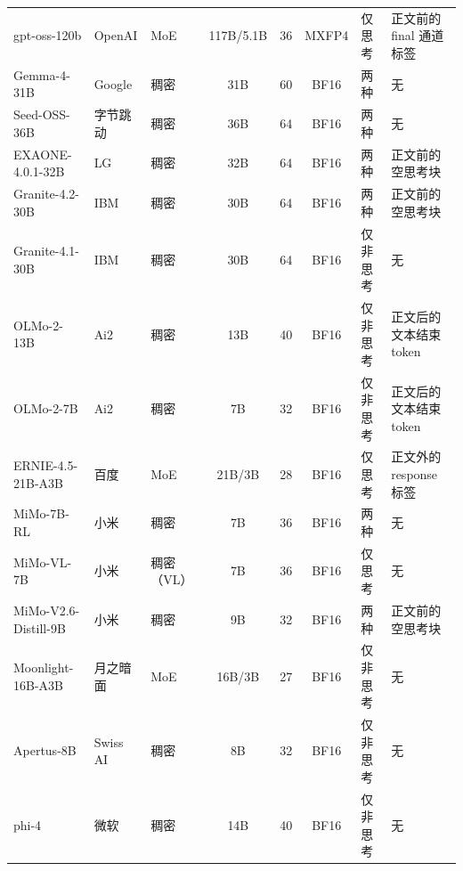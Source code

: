 \begin{table}[htbp]
\begin{tabular}{ll>{\raggedright\arraybackslash}p{1.9cm}cccl>{\raggedright\arraybackslash}p{2.8cm}}
gpt-oss-120b & OpenAI & MoE & 117B/5.1B & 36 & MXFP4 & 仅思考 & 正文前的 final 通道标签 \\
Gemma-4-31B & Google & 稠密 & 31B & 60 & BF16 & 两种 & 无 \\
Seed-OSS-36B & 字节跳动 & 稠密 & 36B & 64 & BF16 & 两种 & 无 \\
EXAONE-4.0.1-32B & LG & 稠密 & 32B & 64 & BF16 & 两种 & 正文前的空思考块 \\
Granite-4.2-30B & IBM & 稠密 & 30B & 64 & BF16 & 两种 & 正文前的空思考块 \\
Granite-4.1-30B & IBM & 稠密 & 30B & 64 & BF16 & 仅非思考 & 无 \\
OLMo-2-13B & Ai2 & 稠密 & 13B & 40 & BF16 & 仅非思考 & 正文后的文本结束 token \\
OLMo-2-7B & Ai2 & 稠密 & 7B & 32 & BF16 & 仅非思考 & 正文后的文本结束 token \\
ERNIE-4.5-21B-A3B & 百度 & MoE & 21B/3B & 28 & BF16 & 仅思考 & 正文外的 response 标签 \\
MiMo-7B-RL & 小米 & 稠密 & 7B & 36 & BF16 & 两种 & 无 \\
MiMo-VL-7B & 小米 & 稠密（VL） & 7B & 36 & BF16 & 仅思考 & 无 \\
MiMo-V2.6-Distill-9B & 小米 & 稠密 & 9B & 32 & BF16 & 两种 & 正文前的空思考块 \\
Moonlight-16B-A3B & 月之暗面 & MoE & 16B/3B & 27 & BF16 & 仅非思考 & 无 \\
Apertus-8B & Swiss AI & 稠密 & 8B & 32 & BF16 & 仅非思考 & 无 \\
phi-4 & 微软 & 稠密 & 14B & 40 & BF16 & 仅非思考 & 无 \\
\bottomrule
\end{tabular}
\end{table}

